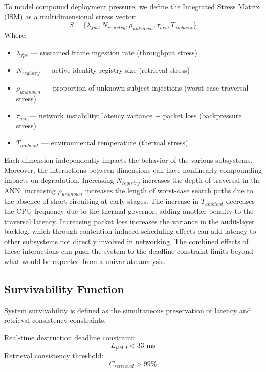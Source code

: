 \documentclass[conference]{IEEEtran}
\begin{document}
To model compound deployment pressure, we define the Integrated Stress Matrix (ISM) as a multidimensional stress vector:
\begin{equation}
S = \{ \lambda_{fps}, N_{registry}, \rho_{unknown}, \tau_{net}, T_{ambient} \}
\end{equation}
Where:
\begin{itemize}
    \item $\lambda_{fps}$ — sustained frame ingestion rate (throughput stress)
    \item $N_{registry}$ — active identity registry size (retrieval stress)
    \item $\rho_{unknown}$ — proportion of unknown-subject injections (worst-case traversal stress)
    \item $\tau_{net}$ — network instability: latency variance + packet loss (backpressure stress)
    \item $T_{ambient}$ — environmental temperature (thermal stress)
\end{itemize}

Each dimension independently impacts the behavior of the various subsystems. Moreover, the interactions between dimensions can have nonlinearly compounding impacts on degradation. Increasing $N_{registry}$ increases the depth of traversal in the ANN; increasing $\rho_{unknown}$ increases the length of worst-case search paths due to the absence of short-circuiting at early stages. The increase in $T_{ambient}$ decreases the CPU frequency due to the thermal governor, adding another penalty to the traversal latency. Increasing packet loss increases the variance in the audit-layer backlog, which through contention-induced scheduling effects can add latency to other subsystems not directly involved in networking. The combined effects of these interactions can push the system to the deadline constraint limits beyond what would be expected from a univariate analysis.

\subsection{Survivability Function}
System survivability is defined as the simultaneous preservation of latency and retrieval consistency constraints.

Real-time destruction deadline constraint:
\begin{equation}
L_{p99.9} < 33\text{ ms}
\end{equation}
Retrieval consistency threshold:
\begin{equation}
C_{retrieval} > 99\%
\end{equation}
\end{document}
